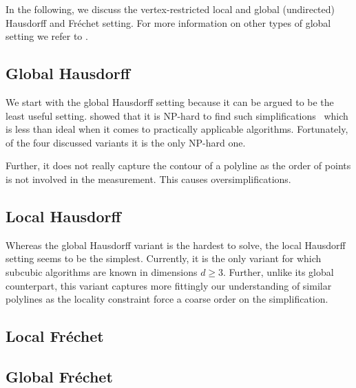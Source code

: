 In the following, we discuss the vertex-restricted local and global (undirected) Hausdorff and Fréchet setting. For more information on other types of global setting we refer to \citeauthor{global_curve_simplification}.

\subsection{Global Hausdorff}
We start with the global Hausdorff setting because it can be argued to be the least useful setting. \citeauthor{on_optimal_polyline_simplification_using_the_hausdorff_and_frechet_distance} showed that it is NP-hard to find such simplifications~\cite{on_optimal_polyline_simplification_using_the_hausdorff_and_frechet_distance} which is less than ideal when it comes to practically applicable algorithms. Fortunately, of the four discussed variants it is the only NP-hard one.

Further, it does not really capture the contour of a polyline as the order of points is not involved in the measurement. This causes oversimplifications.


\subsection{Local Hausdorff}
Whereas the global Hausdorff variant is the hardest to solve, the local Hausdorff setting seems to be the simplest. Currently, it  is the only variant for which subcubic algorithms are known in dimensions \(d \geq 3\). Further, unlike its global counterpart, this variant captures more fittingly our understanding of similar polylines as the locality constraint force a coarse order on the simplification.


\subsection{Local Fréchet}

\subsection{Global Fréchet}






